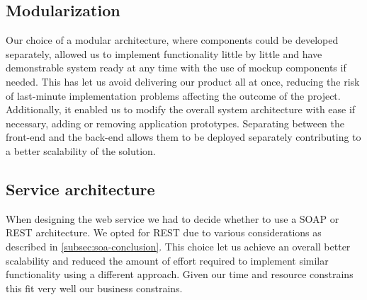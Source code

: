 \subsection{Modularization}
Our choice of a modular architecture, where components could be developed separately,
allowed us to implement functionality little by little and have demonstrable
system ready at any time with the use of mockup components if needed.
This has let us avoid delivering our product all at once, reducing the risk
of last-minute implementation problems affecting the outcome of the project.
Additionally, it enabled us to modify the overall system architecture with ease
if necessary, adding or removing application prototypes.
Separating between the front-end and the back-end allows them to be deployed
separately contributing to a better scalability of the solution.

\subsection{Service architecture}

When designing the web service we had to decide whether to use a SOAP or REST architecture.
We opted for REST due to various considerations as described in \ref{subsec:soa-conclusion}.
This choice let us achieve an overall better scalability and reduced the amount of effort
required to implement similar functionality using a different approach.
Given our time and resource constrains this fit very well our business constrains.

